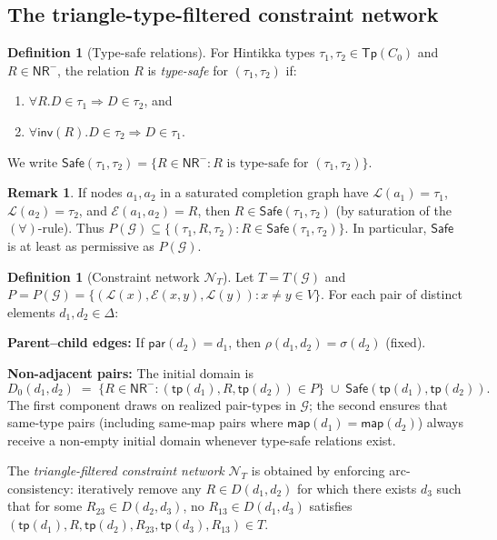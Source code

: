 \documentclass[a4paper,11pt]{article}
\theoremstyle{definition}
\newtheorem{definition}[theorem]{Definition}
\newtheorem{remark}[theorem]{Remark}
\newcommand{\inv}{\ensuremath{\mathsf{inv}}}
\newcommand{\tp}{\ensuremath{\mathsf{tp}}}
\newcommand{\Tp}{\ensuremath{\mathsf{Tp}}}
\newcommand{\NR}{\ensuremath{\mathsf{NR}}}
\newcommand{\Safe}{\ensuremath{\mathsf{Safe}}}
\newcommand{\GG}{\ensuremath{\mathcal{G}}}
\newcommand{\LL}{\ensuremath{\mathcal{L}}}
\newcommand{\EE}{\ensuremath{\mathcal{E}}}
\newcommand{\NN}{\ensuremath{\mathcal{N}}}
\begin{document}
\subsection{The triangle-type-filtered constraint network}
\label{sec:network}

\begin{definition}[Type-safe relations]\label{def:safe}
For Hintikka types $\tau_1, \tau_2 \in \Tp(C_0)$ and
$R \in \NR^{-}$, the relation $R$ is \emph{type-safe} for
$(\tau_1, \tau_2)$ if:
\begin{enumerate}[nosep,label=(\alph*)]
  \item $\forall R.D \in \tau_1 \Rightarrow D \in \tau_2$, and
  \item $\forall \inv(R).D \in \tau_2 \Rightarrow D \in \tau_1$.
\end{enumerate}
We write $\Safe(\tau_1, \tau_2) = \{R \in \NR^{-} :
R \text{ is type-safe for } (\tau_1, \tau_2)\}$.
\end{definition}

\begin{remark}
If nodes $a_1, a_2$ in a saturated completion graph have
$\LL(a_1) = \tau_1$, $\LL(a_2) = \tau_2$, and
$\EE(a_1, a_2) = R$, then $R \in \Safe(\tau_1, \tau_2)$
(by saturation of the $(\forall)$-rule).  Thus $P(\GG)
\subseteq \{(\tau_1, R, \tau_2) : R \in \Safe(\tau_1,\tau_2)\}$.
In particular, $\Safe$ is at least as permissive as $P(\GG)$.
\end{remark}

\begin{definition}[Constraint network $\NN_T$]\label{def:network}
Let $T = T(\GG)$ and $P = P(\GG) = \{(\LL(x), \EE(x,y), \LL(y))
: x \neq y \in V\}$.  For each pair of distinct elements
$d_1, d_2 \in \Delta$:

\medskip\noindent\textbf{Parent--child edges:}\;
If $\mathsf{par}(d_2) = d_1$, then $\rho(d_1, d_2) = \sigma(d_2)$
(fixed).

\medskip\noindent\textbf{Non-adjacent pairs:}\;
The initial domain is
\[
D_0(d_1, d_2) \;=\; \{R \in \NR^{-} : (\tp(d_1), R,
\tp(d_2)) \in P\} \;\cup\; \Safe(\tp(d_1), \tp(d_2)).
\]
The first component draws on realized pair-types in $\GG$;
the second ensures that same-type pairs (including same-map
pairs where $\mathsf{map}(d_1) = \mathsf{map}(d_2)$) always
receive a non-empty initial domain whenever type-safe relations
exist.

\medskip
The \emph{triangle-filtered constraint network} $\NN_T$ is
obtained by enforcing arc-consistency: iteratively remove any
$R \in D(d_1, d_2)$ for which there exists $d_3$ such that for
some $R_{23} \in D(d_2, d_3)$, no $R_{13} \in D(d_1, d_3)$
satisfies
$(\tp(d_1), R, \tp(d_2), R_{23}, \tp(d_3), R_{13}) \in T$.
\end{definition}
\end{document}

